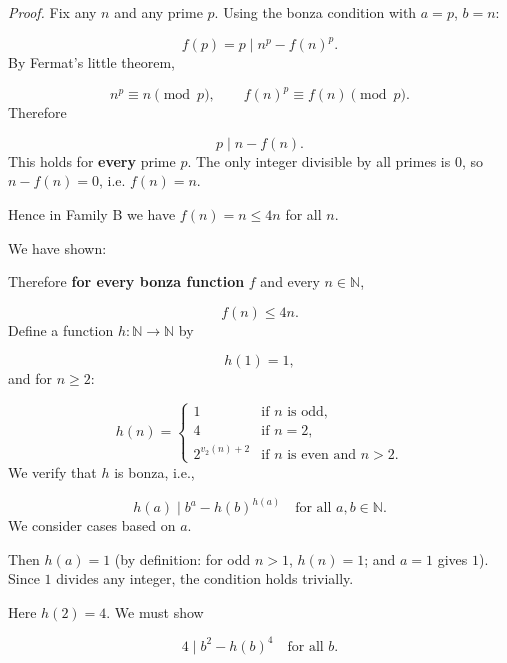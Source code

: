 \emph{Proof.} Fix any \(n\) and any prime \(p\). Using the bonza condition with \(a=p\), \(b=n\):\par
\[
f(p)=p \mid n^{p} - f(n)^{p}.
\]
By Fermat's little theorem,\par
\[
n^{p}\equiv n\pmod p,\qquad f(n)^{p}\equiv f(n)\pmod p.
\]
Therefore\par
\[
p\mid n - f(n).
\]
This holds for \textbf{every} prime \(p\). The only integer divisible by all primes is 0, so \(n-f(n)=0\), i.e. \(f(n)=n\).\par
Hence in Family B we have \(f(n)=n\le 4n\) for all \(n\).\par
\smallskip
{}
We have shown:\par
{}
Therefore \textbf{for every bonza function }\(f\) and every \(n\in\mathbb N\),\textbf{}\par
\[
\boxed{f(n)\le 4n}.
\]
\smallskip
{}
Define a function \(h:\mathbb N\to\mathbb N\) by\par
\[
h(1)=1,
\]
and for \(n\ge 2\):\par
\[
h(n)=\begin{cases}
1 & \text{if } n \text{ is odd},\\[2pt]
4 & \text{if } n=2,\\[2pt]
2^{v_{2}(n)+2} & \text{if } n \text{ is even and } n>2.
\end{cases}
\]
We verify that \(h\) is bonza, i.e.,\par
\[
h(a)\mid b^{a} - h(b)^{h(a)}\quad\text{for all } a,b\in\mathbb N.
\]
\smallskip
{}
We consider cases based on \(a\).\par
{}
Then \(h(a)=1\) (by definition: for odd \(n>1\), \(h(n)=1\); and \(a=1\) gives \(1\)). Since \(1\) divides any integer, the condition holds trivially.\par
{}
Here \(h(2)=4\). We must show\par
\[
  4\mid b^{2} - h(b)^{4}\quad\text{for all } b.
  \]
